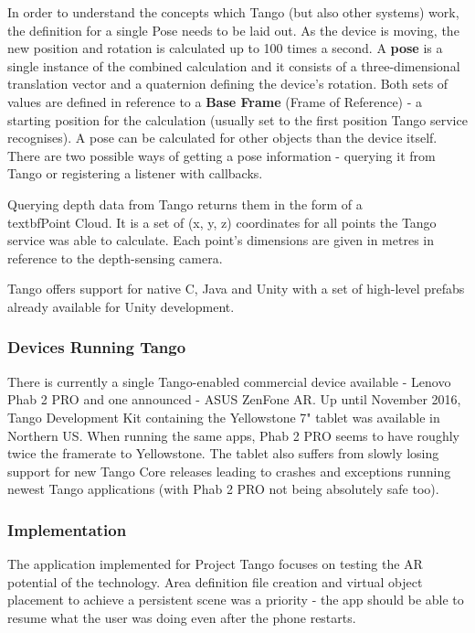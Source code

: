 \documentclass[12pt, a4paper]{article}
\begin{document}
In order to understand the concepts which Tango (but also other systems) work, the definition for a single Pose needs to be laid out. As the device is moving, the new position and rotation is calculated up to 100 times a second. A \textbf{pose} is a single instance of the combined calculation and it consists of a three-dimensional translation vector and a quaternion defining the device’s rotation. Both sets of values are defined in reference to a \textbf{Base Frame} (Frame of Reference) - a starting position for the calculation (usually set to the first position Tango service recognises). A pose can be calculated for other objects than the device itself. There are two possible ways of getting a pose information - querying it from Tango or registering a listener with callbacks.

Querying depth data from Tango returns them in the form of a \\textbf{Point Cloud}. It is a set of (x, y, z) coordinates for all points the Tango service was able to calculate. Each point’s dimensions are given in metres in reference to the depth-sensing camera.

Tango offers support for native C, Java and Unity with a set of high-level prefabs already available for Unity development.

\subsubsection{Devices Running Tango}
There is currently a single Tango-enabled commercial device available - Lenovo Phab 2 PRO and one announced - ASUS ZenFone AR. Up until November 2016, Tango Development Kit containing the Yellowstone 7" tablet was available in Northern US. When running the same apps, Phab 2 PRO seems to have roughly twice the framerate to Yellowstone. The tablet also suffers from slowly losing support for new Tango Core releases leading to crashes and exceptions running newest Tango applications (with Phab 2 PRO not being absolutely safe too).

\subsubsection{Implementation}
The application implemented for Project Tango focuses on testing the AR potential of the technology. Area definition file creation and virtual object placement to achieve a persistent scene was a priority - the app should be able to resume what the user was doing even after the phone restarts.
\end{document}

